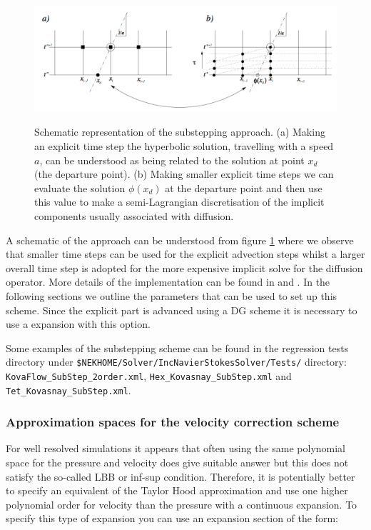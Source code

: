 \begin{figure}[!htbp]
\label{fig.substep}
  \centering
 {\includegraphics[width=1 \textwidth]{img/substepimage.png}}
   \caption {Schematic representation of the substepping approach. (a)
     Making an explicit time step the hyperbolic solution, travelling
     with a speed $a$, can be understood as being related to the
     solution at point $x_d$ (the departure point). (b) Making smaller
     explicit time steps we can evaluate the solution $\phi(x_d)$ at
     the departure point and then use this value to make a
     semi-Lagrangian discretisation of the implicit components usually
     associated with diffusion.}
\end{figure}


A schematic of the approach can be understood from figure
\ref{fig.substep} where we observe that smaller time steps can be used
for the explicit advection steps whilst a larger overall time step is
adopted for the more expensive implicit solve for the diffusion
operator. More details of the implementation can be found in
\cite{XiShDoKa} and \cite{Sh03}. In the following sections we outline
the parameters that can be used to set up this scheme. Since the
explicit part is advanced using a DG scheme it is necessary to use a
 expansion with this option.

\begin{notebox}
Some examples of the substepping scheme can be found in the regression tests
directory under
\texttt{\${NEKHOME}/Solver/IncNavierStokesSolver/Tests/} directory:
\texttt{KovaFlow\_SubStep\_2order.xml},
\texttt{Hex\_Kovasnay\_SubStep.xml} and
\texttt{Tet\_Kovasnay\_SubStep.xml}.
\end{notebox}

\subsubsection{Approximation spaces for the velocity correction scheme}

For well resolved simulations it appears that often using the same
polynomial space for the pressure and velocity does give suitable
answer but this does not satisfy the so-called LBB or inf-sup
condition. Therefore, it is potentially better to specify an equivalent
of the Taylor Hood approximation and use one higher polynomial order
for velocity than the pressure with a continuous expansion. To specify
this type of expansion you can use an expansion section of the form:

